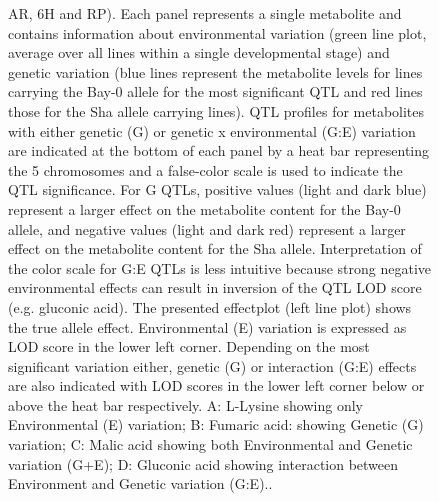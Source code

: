 \begin{figure}[h!]
{          AR, 6H and RP). Each panel represents a single metabolite and contains information about environmental 
          variation (green line plot, average over all lines within a single developmental stage) and genetic 
          variation (blue lines represent the metabolite levels for lines carrying the Bay-0 allele for the most 
          significant QTL and red lines those for the Sha allele carrying lines). QTL profiles for metabolites 
          with either genetic (G) or genetic x environmental (G:E) variation are indicated at the bottom of each 
          panel by a heat bar representing the 5 chromosomes and a false-color scale is used to indicate the QTL 
          significance. For G QTLs, positive values (light and dark blue) represent a larger effect on the metabolite 
          content for the Bay-0 allele, and negative values (light and dark red) represent a larger effect on the 
          metabolite content for the Sha allele. Interpretation of the color scale for G:E QTLs is less intuitive 
          because strong negative environmental effects can result in inversion of the QTL LOD score (e.g. gluconic acid). 
          The presented effectplot (left line plot) shows the true allele effect. Environmental (E) variation is 
          expressed as LOD score in the lower left corner. Depending on the most significant variation either, 
          genetic (G) or interaction (G:E) effects are also indicated with LOD scores in the lower left corner below 
          or above the heat bar respectively. A: L-Lysine showing only Environmental (E) variation; B: Fumaric acid: 
          showing Genetic (G) variation; C: Malic acid showing both Environmental and Genetic variation (G+E); D: 
          Gluconic acid showing interaction between Environment and Genetic variation (G:E)..}
\end{figure}

